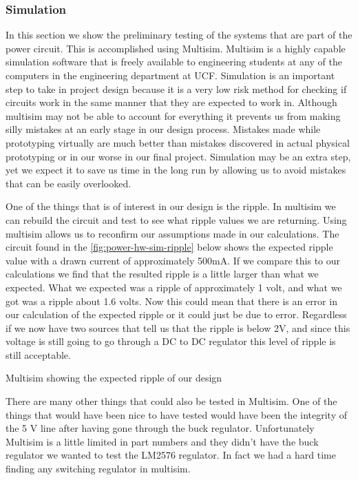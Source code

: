\subsubsection{Simulation}
In this section we show the preliminary testing of the systems that are
part of the power circuit. This is accomplished using Multisim. Multisim
is a highly capable simulation software that is freely available to engineering
students at any of the computers in the engineering department at UCF.
Simulation is an important step to take in project design because it is a very
low risk method for checking if circuits work in the same manner that they are
expected to work in. Although multisim may not be able to account for
everything it prevents us from making silly mistakes at an early stage in our
design process. Mistakes made while prototyping virtually are much better than
mistakes discovered in actual physical prototyping or in our worse in our final
project. Simulation may be an extra step, yet we expect it to save us time in
the long run by allowing us to avoid mistakes that can be easily overlooked.

One of the things that is of interest in our design is the ripple. In multisim
we can rebuild the circuit and test to see what ripple values we are returning.
Using multisim allows us to reconfirm our assumptions made in our calculations.
The circuit found in the \autoref{fig:power-hw-sim-ripple} below shows the expected ripple
value with a drawn current of approximately 500mA. If we compare this to our
calculations we find that the resulted ripple is a little larger than what we
expected. What we expected was a ripple of approximately 1 volt, and what we
got was a ripple about 1.6 volts.  Now this could mean that there is an error
in our calculation of the expected ripple or it could just be due to error.
Regardless if we now have two sources that tell us that the ripple is below 2V,
and since this voltage is still going to go through a DC to DC regulator this
level of ripple is still acceptable.

{Multisim showing the expected ripple of our design}

There are many other things that could also be tested in Multisim. One of the
things that would have been nice to have tested would have been the integrity
of the 5 V line after having gone through the buck regulator. Unfortunately
Multisim is a little limited in part numbers and they didn{}'t have the buck
regulator we wanted to test the LM2576 regulator. In fact we had a hard time
finding any switching regulator in multisim.

